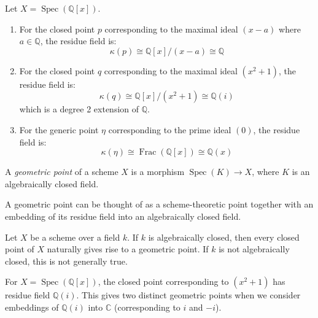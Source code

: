 \documentclass[12pt]{article}
\begin{document}
\begin{example}
    Let $X = \operatorname{Spec}(\mathbb{Q}[x])$.
    \begin{enumerate}
        \item For the closed point $p$ corresponding to the maximal ideal $(x-a)$ where $a \in \mathbb{Q}$, the residue field is:
              \[
                  \kappa(p) \cong \mathbb{Q}[x]/(x-a) \cong \mathbb{Q}
              \]

        \item For the closed point $q$ corresponding to the maximal ideal $(x^2 + 1)$, the residue field is:
              \[
                  \kappa(q) \cong \mathbb{Q}[x]/(x^2 + 1) \cong \mathbb{Q}(i)
              \]
              which is a degree 2 extension of $\mathbb{Q}$.

        \item For the generic point $\eta$ corresponding to the prime ideal $(0)$, the residue field is:
              \[
                  \kappa(\eta) \cong \operatorname{Frac}(\mathbb{Q}[x]) \cong \mathbb{Q}(x)
              \]
    \end{enumerate}
\end{example}


\begin{definition}
    A \textit{geometric point} of a scheme $X$ is a morphism $\operatorname{Spec}(K) \to X$, where $K$ is an algebraically closed field.
\end{definition}

\begin{remark}
    A geometric point can be thought of as a scheme-theoretic point together with an embedding of its residue field into an algebraically closed field.
\end{remark}

\begin{proposition}
    Let $X$ be a scheme over a field $k$. If $k$ is algebraically closed, then every closed point of $X$ naturally gives rise to a geometric point. If $k$ is not algebraically closed, this is not generally true.
\end{proposition}

\begin{example}
    For $X = \operatorname{Spec}(\mathbb{Q}[x])$, the closed point corresponding to $(x^2 + 1)$ has residue field $\mathbb{Q}(i)$. This gives two distinct geometric points when we consider embeddings of $\mathbb{Q}(i)$ into $\mathbb{C}$ (corresponding to $i$ and $-i$).
\end{example}
\end{document}
